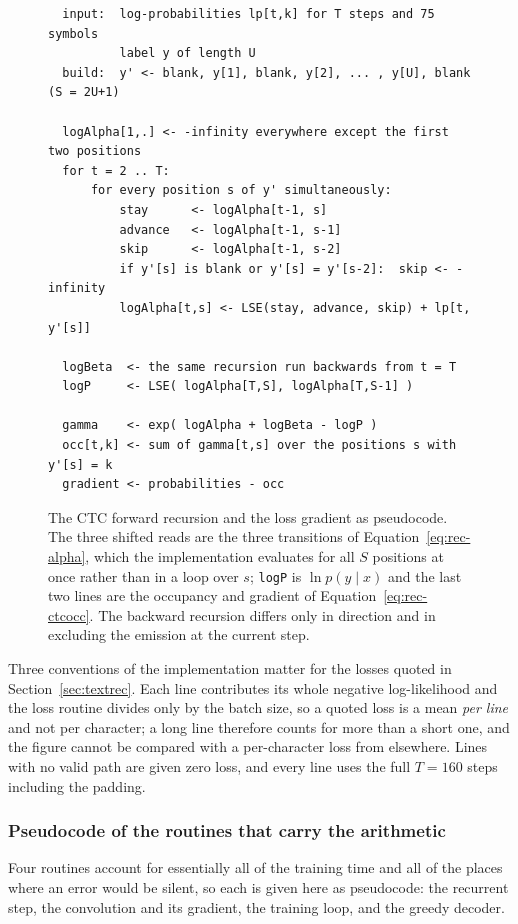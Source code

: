 \begin{figure}[h]
\centering
\fontsize{8.5}{10.2}\selectfont
\begin{verbatim}
  input:  log-probabilities lp[t,k] for T steps and 75 symbols
          label y of length U
  build:  y' <- blank, y[1], blank, y[2], ... , y[U], blank      (S = 2U+1)

  logAlpha[1,.] <- -infinity everywhere except the first two positions
  for t = 2 .. T:
      for every position s of y' simultaneously:
          stay      <- logAlpha[t-1, s]
          advance   <- logAlpha[t-1, s-1]
          skip      <- logAlpha[t-1, s-2]
          if y'[s] is blank or y'[s] = y'[s-2]:  skip <- -infinity
          logAlpha[t,s] <- LSE(stay, advance, skip) + lp[t, y'[s]]

  logBeta  <- the same recursion run backwards from t = T
  logP     <- LSE( logAlpha[T,S], logAlpha[T,S-1] )

  gamma    <- exp( logAlpha + logBeta - logP )
  occ[t,k] <- sum of gamma[t,s] over the positions s with y'[s] = k
  gradient <- probabilities - occ
\end{verbatim}
\caption{The CTC forward recursion and the loss gradient as pseudocode. The three shifted reads are the three transitions of Equation~\ref{eq:rec-alpha}, which the implementation evaluates for all $S$ positions at once rather than in a loop over $s$; \texttt{logP} is $\ln p(y\mid x)$ and the last two lines are the occupancy and gradient of Equation~\ref{eq:rec-ctcocc}. The backward recursion differs only in direction and in excluding the emission at the current step.}
\label{fig:rec-ctcpseudo}
\end{figure}

Three conventions of the implementation matter for the losses quoted in Section~\ref{sec:textrec}.
Each line contributes its whole negative log-likelihood and the loss routine divides only by the batch size, so a quoted loss is a mean \emph{per line} and not per character; a long line therefore counts for more than a short one, and the figure cannot be compared with a per-character loss from elsewhere.
Lines with no valid path are given zero loss, and every line uses the full $T=160$ steps including the padding.

\subsubsection{Pseudocode of the routines that carry the arithmetic}

Four routines account for essentially all of the training time and all of the places where an error would be silent, so each is given here as pseudocode: the recurrent step, the convolution and its gradient, the training loop, and the greedy decoder.

